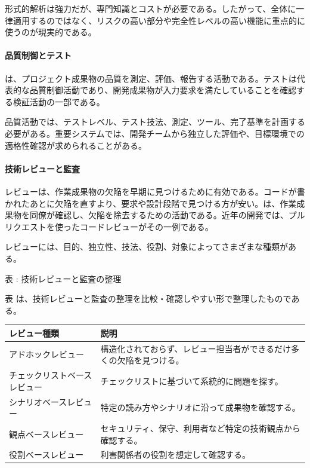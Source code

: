 形式的解析は強力だが、専門知識とコストが必要である。したがって、全体に一律適用するのではなく、リスクの高い部分や完全性レベルの高い機能に重点的に使うのが現実的である。

\paragraph{品質制御とテスト}
は、プロジェクト成果物の品質を測定、評価、報告する活動である。テストは代表的な品質制御活動であり、開発成果物が入力要求を満たしていることを確認する検証活動の一部である。

品質活動では、テストレベル、テスト技法、測定、ツール、完了基準を計画する必要がある。重要システムでは、開発チームから独立した評価や、目標環境での適格性確認が求められることがある。

\paragraph{技術レビューと監査}
レビューは、作業成果物の欠陥を早期に見つけるために有効である。コードが書かれたあとに欠陥を直すより、要求や設計段階で見つける方が安い。は、作業成果物を同僚が確認し、欠陥を除去するための活動である。近年の開発では、プルリクエストを使ったコードレビューがその一例である。

レビューには、目的、独立性、技法、役割、対象によってさまざまな種類がある。


\noindent\par\smallskip\noindent{}\label{tab:ch12-04}表 \thetable: 技術レビューと監査の整理\par\smallskip
表 \thetable は、技術レビューと監査の整理を比較・確認しやすい形で整理したものである。\par\smallskip
\begin{tabularx}{\textwidth}{L{0.25\textwidth}Y}
\toprule
レビュー種類 & 説明 \\
\midrule
アドホックレビュー & 構造化されておらず、レビュー担当者ができるだけ多くの欠陥を見つける。 \\
チェックリストベースレビュー & チェックリストに基づいて系統的に問題を探す。 \\
シナリオベースレビュー & 特定の読み方やシナリオに沿って成果物を確認する。 \\
観点ベースレビュー & セキュリティ、保守、利用者など特定の技術観点から確認する。 \\
役割ベースレビュー & 利害関係者の役割を想定して確認する。 \\
\bottomrule
\end{tabularx}


